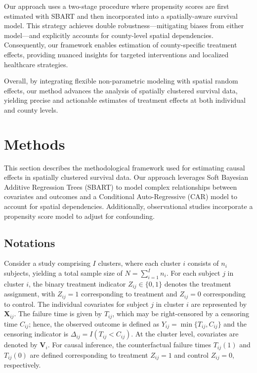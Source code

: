 \documentclass[useAMS,referee]{biom}
\begin{document}
Our approach uses a two-stage procedure where propensity scores are first estimated with SBART and then incorporated into a spatially-aware survival model. This strategy achieves double robustness—mitigating biases from either model—and explicitly accounts for county-level spatial dependencies. Consequently, our framework enables estimation of county-specific treatment effects, providing nuanced insights for targeted interventions and localized healthcare strategies.

Overall, by integrating flexible non-parametric modeling with spatial random effects, our method advances the analysis of spatially clustered survival data, yielding precise and actionable estimates of treatment effects at both individual and county levels.











\section{Methods}

This section describes the methodological framework used for estimating causal effects in spatially clustered survival data. Our approach leverages Soft Bayesian Additive Regression Trees (SBART) to model complex relationships between covariates and outcomes and a Conditional Auto-Regressive (CAR) model to account for spatial dependencies. Additionally, observational studies incorporate a propensity score model to adjust for confounding. 


\subsection{Notations}

Consider a study comprising \(I\) clusters, where each cluster \(i\) consists of \(n_i\) subjects, yielding a total sample size of \(N = \sum_{i=1}^{I} n_i\). For each subject \(j\) in cluster \(i\), the binary treatment indicator \(Z_{ij} \in \{0,1\}\) denotes the treatment assignment, with \(Z_{ij}=1\) corresponding to treatment and \(Z_{ij}=0\) corresponding to control. The individual covariates for subject \(j\) in cluster \(i\) are represented by \(\bm{X}_{ij}\). The failure time is given by \(T_{ij}\), which may be right-censored by a censoring time \(C_{ij}\); hence, the observed outcome is defined as \(Y_{ij} = \min\{T_{ij}, C_{ij}\}\) and the censoring indicator is \(\Delta_{ij} = I(T_{ij} < C_{ij})\). At the cluster level, covariates are denoted by \(\bm{V}_i\). For causal inference, the counterfactual failure times \(T_{ij}(1)\) and \(T_{ij}(0)\) are defined corresponding to treatment \(Z_{ij}=1\) and control \(Z_{ij}=0\), respectively.
\end{document}
